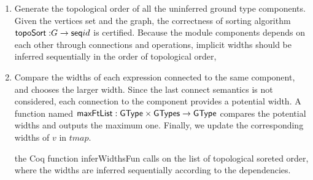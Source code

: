 {\begin{enumerate}
    
    \item Generate the topological order of all the uninferred ground type components. Given the vertices set and the graph, the correctness of sorting algorithm ${\sf topoSort : } G \rightarrow {\sf seq} id $ is certified. Because the module components depends on each other through connections and operations, implicit widths should be inferred sequentially in the order of topological order,

    \item Compare the widths of each expression connected to the same component, and chooses the larger width. Since the last connect semantics is not considered, each connection to the component provides a potential width. A function named ${\sf maxFtList : GType \times {\sf GTypes} \rightarrow GType}$ compares the potential widths and outputs the maximum one. Finally, we update the corresponding widths of $v$ in $tmap$.
    
the Coq function {\sf inferWidthsFun} calls {} on the list of topological soreted order, where the widths are inferred sequentially according to the dependencies. 
\end{enumerate}
}



